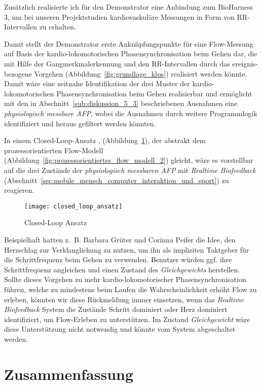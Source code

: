 Zusätzlich realisierte ich für den Demonstrator eine Anbindung zum BioHarness 3, um bei unseren Projektstudien \citep{Grueter2016a} kardiovaskuläre Messungen in Form von RR-Intervallen zu erhalten.

Damit stellt der Demonstrator erste Anknüpfungspunkte für eine Flow-Messung auf Basis der kardio-lokomotorischen Phasensynchronisation beim Gehen dar, die mit Hilfe der Gangmerkmalerkennung und den RR-Intervallen durch das ereignis-bezogene Vorgehen (Abbildung~\ref{fig:grundlage_klps}) realisiert werden könnte. Damit wäre eine zeitnahe Identifikation der drei Muster der kardio-lokomotorischen Phasensynchronisation beim Gehen realisierbar und ermöglicht mit den in Abschnitt~\ref{sub:diskussion_5_3} beschriebenen Ausnahmen eine \emph{physiologisch messbare \ac{AFP}}, wobei die Ausnahmen durch weitere Programmlogik identifiziert und heraus gefiltert werden könnten. 

In einem Closed-Loop-Ansatz \citep[][S.~474]{Calvo2015}, (Abbildung~\ref{fig:closed_loop_ansatz}), der abstrakt dem prozessorientierten Flow-Modell (Abbildung~\ref{fig:prozessorientiertes_flow_modell_2}) gleicht, wäre es vorstellbar auf die drei Zustände der \emph{physiologisch messbaren \ac{AFP}} mit \emph{Realtime Biofeedback} (Abschnitt~\ref{sec:mobile_mensch_computer_interaktion_und_sport}) zu reagieren. 
\begin{figure}
	[!htb] \centering 
	\texttt{[image: closed\_loop\_ansatz]} \caption[Closed-Loop Ansatz]{Closed-Loop Ansatz} \label{fig:closed_loop_ansatz} 
\end{figure}

Beispielhaft hatten z.~B. Barbara Grüter und Corinna Peifer die Idee, den Herzschlag zur Verklanglichung zu nutzen, um ihn als impliziten Taktgeber für die Schrittfrequenz beim Gehen zu verwenden. Benutzer würden ggf. ihre Schrittfrequenz angleichen und einen Zustand des \emph{Gleichgewichts} herstellen. Sollte dieses Vorgehen zu mehr kardio-lokomotorischer Phasensynchronisation führen, welche zu mindestens beim Laufen die Wahrscheinlichkeit erhöht Flow zu erleben, könnten wir diese Rückmeldung immer einsetzen, wenn das \emph{Realtime Biofeedback} System die Zustände {Schritt dominiert} oder {Herz dominiert} identifiziert, um Flow-Erleben zu unterstützen. Im Zustand \emph{Gleichgewicht} wäre diese Unterstützung nicht notwendig und könnte vom System abgeschaltet werden. 

\section{Zusammenfassung} 

